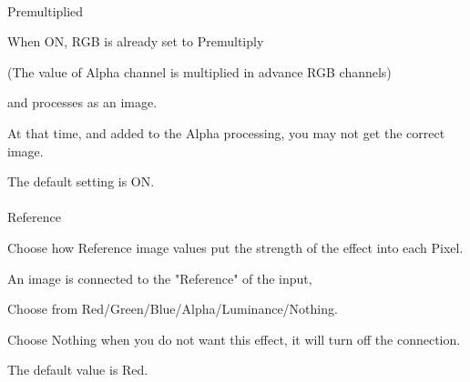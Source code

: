 \documentclass[a4paper,12pt]{article}
\begin{document}
\newpage

\thispagestyle{empty}

\ \vspace{-0.2em}
\par
\noindent Premultiplied\par
When ON, RGB is already set to Premultiply\par
(The value of Alpha channel is multiplied in advance RGB channels)\par
and processes as an image.\par
At that time, and added to the Alpha processing, you may not get the correct image.\par
The default setting is ON.\\
\\
Reference\par
Choose how Reference image values put the strength of the effect into each Pixel.\par
An image is connected to the "Reference" of the input,\par
Choose from Red/Green/Blue/Alpha/Luminance/Nothing.\par
Choose Nothing when you do not want this effect, it will turn off the connection.\par
The default value is Red.
\end{document}
